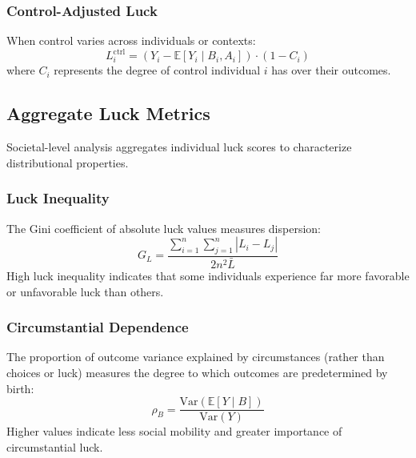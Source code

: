 \subsubsection{Control-Adjusted Luck}

When control varies across individuals or contexts:
\begin{equation}
  L_{i}^{\text{ctrl}}= (Y_{i}- \mathbb{E}[Y_{i}\mid B_{i}, A_{i}]) \cdot
  (1 - C_{i})
\end{equation}
where $C_{i}$ represents the degree of control individual $i$ has over
their outcomes.

\subsection{Aggregate Luck Metrics}

Societal-level analysis aggregates individual luck scores to characterize
distributional properties.

\subsubsection{Luck Inequality}

The Gini coefficient of absolute luck values measures dispersion:
\begin{equation}
  G_{L}= \frac{\sum_{i=1}^{n}\sum_{j=1}^{n}|L_{i}- L_{j}|}{2n^{2}\bar{L}}
\end{equation}
High luck inequality indicates that some individuals experience far more
favorable or unfavorable luck than others.

\subsubsection{Circumstantial Dependence}

The proportion of outcome variance explained by circumstances (rather than
choices or luck) measures the degree to which outcomes are predetermined
by birth:
\begin{equation}
  \rho_{B}= \frac{\text{Var}(\mathbb{E}[Y \mid B])}{\text{Var}(Y)}
\end{equation}
Higher values indicate less social mobility and greater importance of circumstantial
luck.

